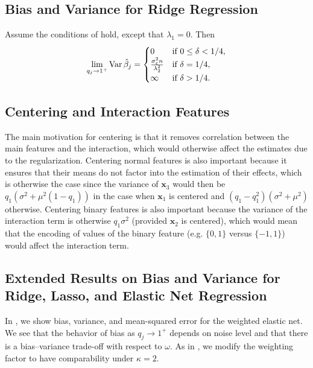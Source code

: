 \subsection{Bias and Variance for Ridge Regression}%
\label{sec:ridge-variance}

\begin{corollary}
  \label{cor:ridge-variance}
  Assume the conditions of  hold, except that
  \(\lambda_1 = 0\). Then
  \[
    \lim_{q_j \rightarrow 1^+} \operatorname{Var} \hat{\beta}_j =
    \begin{cases}
      0                                          & \text{if } 0 \leq \delta < 1/4, \\
      \frac{\sigma_\varepsilon^2 n}{\lambda_2^2} & \text{if } \delta = 1/4,        \\
      \infty                                     & \text{if } \delta > 1/4.
    \end{cases}
  \]
\end{corollary}

\subsection{Centering and Interaction Features}%
\label{sec:centering-interactions}

The main motivation for centering is that it removes correlation between the main features
and the interaction, which would otherwise affect the estimates due to the regularization.
Centering normal features is also important because it ensures that their means do not
factor into the estimation of their effects, which is otherwise the case since the variance
of \(\bm{x}_3\) would then be \(q_1(\sigma^2 + \mu^2(1 - q_1))\) in the case when
\(\bm{x}_1\) is centered and \((q_1 - q_1^2)(\sigma^2 + \mu^2)\) otherwise. Centering
binary features is also important because the variance of the interaction term is otherwise
\(q_1\sigma^2\) (provided \(\bm{x}_2\) is centered), which would mean that the encoding of
values of the binary feature (e.g. \(\{0,1\}\) versus \(\{-1, 1\}\)) would affect the
interaction term.

\subsection{Extended Results on Bias and Variance for Ridge, Lasso, and Elastic Net Regression}%
\label{sec:additional-results-biasvar}

In , we show bias, variance, and mean-squared error
for the weighted elastic net. We see that the behavior of bias as \(q_j \rightarrow 1^+\)
depends on noise level and that there is a bias--variance trade-off with respect to
\(\omega\). As in , we modify the weighting factor to have
comparability under \(\kappa = 2\).

